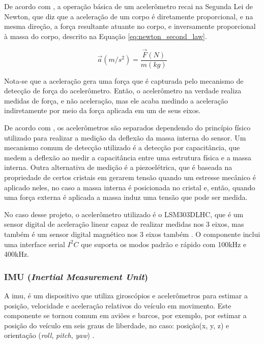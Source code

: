 \documentclass[acronym, symbols]{fei}
\begin{document}
				De acordo com \textcite{dadafshar2014accelerometer}, a operação básica de um acelerômetro recai na Segunda Lei de Newton, que diz que a aceleração de um corpo é diretamente proporcional, e na mesma direção, a força resultante atuante no corpo, e inversamente proporcional à massa do corpo, descrito na Equação \ref{eq:newton_second_law}.
				
				\begin{equation}\label{eq:newton_second_law}
					\overrightarrow{a}(m/s^2) = \frac{\overrightarrow{F}(N)}{m(kg)}
				\end{equation}
			
				Nota-se que a aceleração gera uma força que é capturada pelo mecanismo de detecção de força do acelerômetro. Então, o acelerômetro na verdade realiza medidas de força, e não aceleração, mas ele acaba medindo a aceleração indiretamente por meio da força aplicada em um de seus eixos.
				
				De acordo com \textcite{siegwart2011introduction}, os acelerômetros são separados dependendo do princípio físico utilizado para realizar a medição da deflexão da massa interna do sensor. Um mecanismo comum de detecção utilizado é a detecção por capacitância, que medem a deflexão ao medir a capacitância entre uma estrutura física e a massa interna. Outra alternativa de medição é a piezoelétrica, que é baseada na propriedade de certos cristais em gerarem tensão quando um estresse mecânico é aplicado neles, no caso a massa interna é posicionada no cristal e, então, quando uma força externa é aplicada a massa induz uma tensão que pode ser medida.
				
				No caso desse projeto, o acelerômetro utilizado é o LSM303DLHC, que é um sensor digital de aceleração linear capaz de realizar medidas nos 3 eixos, mas também é um sensor digital magnético nos 3 eixos também \cite{datasheet_accel}. O componente inclui uma interface serial $I^2C$ que suporta os modos padrão e rápido com 100kHz e 400kHz.
				
			\subsubsection{IMU (\textit{Inertial Measurement Unit})}
			
				A \acrshort{imu}, é um dispositivo que utiliza giroscópios e acelerômetros para estimar a posição, velocidade e aceleração relativos do veículo em movimento. Este componente se tornou comum em aviões e barcos, por exemplo, por estimar a posição do veículo em seis graus de liberdade, no caso: posição(x, y, z) e orientação (\textit{roll}, \textit{pitch}, \textit{yaw}) \cite{siegwart2011introduction}.
				
\end{document}
